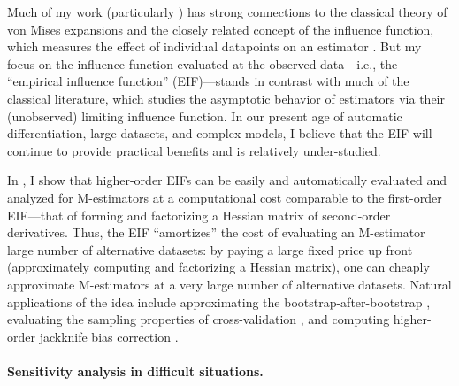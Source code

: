 Much of my work (particularly \citet{giordano:2019:ij, giordano:2020:amip,
giordano:2021:bayesij}) has strong connections to the classical theory of von
Mises expansions and the closely related concept of the influence function,
which measures the effect of individual datapoints on an estimator
\citep{mises:1947:asymptotic, reeds:1976:thesis, hampel:1986:robustbook,
serfling:2009:approximation}.  But my focus on the influence function
evaluated at the observed data---i.e., the ``empirical influence function''
(EIF)---stands in contrast with much of the classical literature, which studies
the asymptotic behavior of estimators via their (unobserved) limiting influence
function.
%
In our present age of automatic differentiation, large datasets, and complex
models, I believe that the EIF will continue to provide practical benefits and
is relatively under-studied.

In \citet{giordano:2019:hoij}, I show that higher-order EIFs can be
easily and automatically evaluated and analyzed for M-estimators at a
computational cost comparable to the first-order EIF---that of forming and
factorizing a Hessian matrix of second-order derivatives.
%
Thus, the EIF ``amortizes'' the cost of evaluating an M-estimator large number
of alternative datasets: by paying a large fixed price up front (approximately
computing and factorizing a Hessian matrix), one can cheaply approximate
M-estimators at a very large number of alternative datasets.  Natural
applications of the idea include approximating the bootstrap-after-bootstrap
\citep{hall:2013:bootstrap}, evaluating the sampling properties of
cross-validation \citep{bayle:2020:cv}, and computing higher-order jackknife
bias correction \citep{shao:2012:jackknife}.

\paragraph{Sensitivity analysis in difficult situations.}

